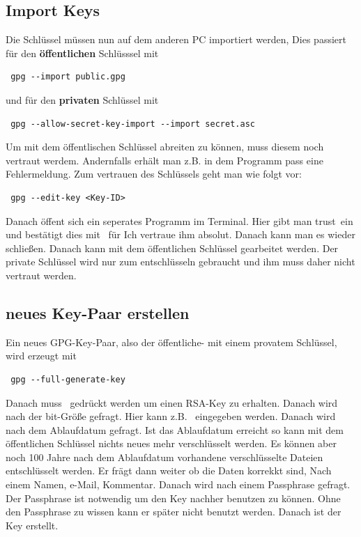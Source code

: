 \documentclass[11pt,fleqn]{book} %
\numberwithin{equation}{section} %
\numberwithin{figure}{section} %
\numberwithin{table}{section} %
\begin{document}
\subsection{Import Keys}
Die Schlüssel müssen nun auf dem anderen PC importiert werden, Dies passiert für den \textbf{öffentlichen} Schlüsssel mit
\begin{lstlisting}
 gpg --import public.gpg
\end{lstlisting}
und für den \textbf{privaten} Schlüssel mit
\begin{lstlisting}
 gpg --allow-secret-key-import --import secret.asc
\end{lstlisting}
Um mit dem öffentlischen Schlüssel abreiten zu können, muss diesem noch vertraut werdem. Andernfalls erhält man z.B. in dem Programm pass eine Fehlermeldung. Zum vertrauen des Schlüssels geht man wie folgt vor:
\begin{lstlisting}
 gpg --edit-key <Key-ID>
\end{lstlisting}
Danach öffent sich ein seperates Programm im Terminal. Hier gibt man \glqq trust\grqq \ ein und bestätigt dies mit  \grqq \ für \glqq Ich vertraue ihm absolut\grqq. Danach kann man es wieder schließen. Danach kann mit dem öffentlichen Schlüssel gearbeitet werden. Der private Schlüssel wird nur zum entschlüsseln gebraucht und ihm muss daher nicht vertraut werden.
\subsection{neues Key-Paar erstellen}
Ein neues GPG-Key-Paar, also der öffentliche- mit einem provatem Schlüssel, wird erzeugt mit
\begin{lstlisting}
 gpg --full-generate-key
\end{lstlisting}
Danach muss \grqq \ gedrückt werden um einen RSA-Key zu erhalten. Danach wird nach der bit-Größe gefragt. Hier kann z.B. \grqq \ eingegeben werden. Danach wird nach dem Ablaufdatum gefragt. Ist das Ablaufdatum erreicht so kann mit dem öffentlichen Schlüssel nichts neues mehr verschlüsselt werden. Es können aber noch 100 Jahre nach dem Ablaufdatum vorhandene verschlüsselte Dateien entschlüsselt werden. Er frägt dann weiter ob die Daten korrekkt sind, Nach einem Namen, e-Mail, Kommentar. Danach wird nach einem Passphrase gefragt. Der Passphrase ist notwendig um den Key nachher benutzen zu können. Ohne den Passphrase zu wissen kann er später nicht benutzt werden. Danach ist der Key erstellt.
\end{document}
